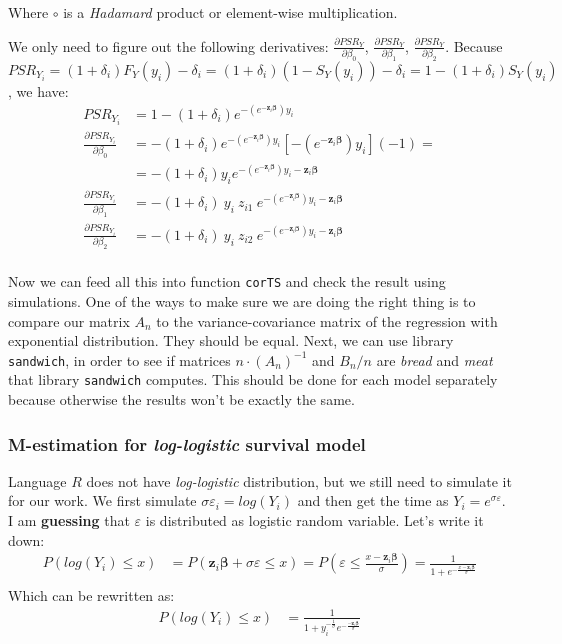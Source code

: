 \documentclass[]{article}
\let\epsilon\varepsilon
\begin{document}
Where $\circ$ is a \emph{Hadamard} product or element-wise multiplication.

We only need to figure out the following derivatives: $\frac{\partial PSR_Y}{\partial \beta_0}$, $\frac{\partial PSR_Y}{\partial \beta_1}$, $\frac{\partial PSR_Y}{\partial \beta_2}$. Because $PSR_{Y_i} = (1+\delta_i)F_Y(y_i) - \delta_i = (1+\delta_i)(1 - S_Y(y_i)) - \delta_i = 1 - (1+\delta_i)S_Y(y_i)$, we have:
  $$
  \begin{aligned}
    PSR_{Y_i} &=  1 - (1+\delta_i)e^{-(e^{-\pmb{z}_i \pmb{\beta}})y_i} \\
    \frac{\partial PSR_{Y_i}}{\partial \beta_0} &= - (1+\delta_i)e^{-(e^{-\pmb{z}_i \pmb{\beta}})y_i}  \left[ -(e^{-\pmb{z}_i \pmb{\beta}})y_i \right] (-1)=\\
    &= - (1+\delta_i)y_i e^{-(e^{-\pmb{z}_i \pmb{\beta}})y_i-\pmb{z}_i \pmb{\beta}}\\
    \frac{\partial PSR_{Y_i}}{\partial \beta_1} &= - (1+\delta_i)~y_i ~z_{i1}~ e^{-(e^{-\pmb{z}_i \pmb{\beta}})y_i -\pmb{z}_i \pmb{\beta}}\\
    \frac{\partial PSR_{Y_i}}{\partial \beta_2} &= - (1+\delta_i)~y_i ~z_{i2}~ e^{-(e^{-\pmb{z}_i \pmb{\beta}})y_i -\pmb{z}_i \pmb{\beta}}\\
  \end{aligned}
  $$

Now we can feed all this into function \texttt{corTS} and check the result using simulations. One of the ways to make sure we are doing the right thing is to compare our matrix $A_n$ to the variance-covariance matrix of the regression with exponential distribution. They should be equal. Next, we can use library \texttt{sandwich}, in order to see if matrices $n\cdot(A_n)^{-1}$ and $B_n/n$ are \emph{bread} and \emph{meat} that library  \texttt{sandwich} computes. This should be done for each model separately because otherwise the results won't be exactly the same.

\subsubsection{M-estimation for \emph{log-logistic} survival model}
\label{MEst:loglogistic}

Language $R$ does not have \emph{log-logistic} distribution, but we still need to simulate it for our work. We first simulate $\sigma\epsilon_i = log(Y_i)$ and then get the time as $Y_i = e^{\sigma\epsilon}$. I am \textbf{guessing} that $\epsilon$ is distributed as logistic random variable. Let's write it down:
  $$
  \begin{aligned}
    P(log(Y_i) \leq x) &= P(\pmb{z}_i\pmb{\beta} + \sigma\epsilon \leq x) = P\left(\epsilon \leq \frac{ x-\pmb{z}_i\pmb{\beta} }{\sigma}\right) = \frac{  1  }{  1 + e^{-\frac{ x-\pmb{z}_i\pmb{\beta} }{\sigma}}} \\
  \end{aligned}
  $$
Which can be rewritten as:
  $$
  \begin{aligned}
    P(log(Y_i) \leq x) &= \frac{  1  }{  1 + y_i^{-\frac{1}{\sigma}} e^{-\frac{-\pmb{z}_i\pmb{\beta}}{\sigma}}   } \\
  \end{aligned}
  $$
\end{document}
